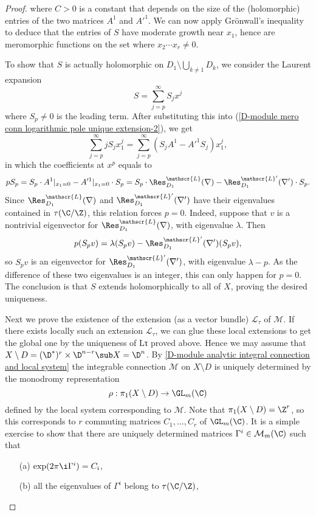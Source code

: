 \begin{proof}
where $C>0$ is a constant that depends on the size of the (holomorphic) entries of the two matrices $A^1$ and $A'^1$. We can now apply Gr\"onwall's inequality to deduce that the entries of $S$ have moderate growth near $x_1$, hence are meromorphic functions on the set where $x_2\cdots x_r\neq 0$.\par
To show that $S$ is actually holomorphic on $D_1\setminus\bigcup_{k\neq 1}D_k$, we consider the Laurent expansion
\[S=\sum_{j=p}^{\infty}S_jx^j\]
where $S_p\neq 0$ is the leading term. After substituting this into (\ref{D-module mero conn logarithmic pole unique extension-2}), we get
\[\sum_{j=p}^{\infty}jS_jx_1^j=\sum_{j=p}^{\infty}(S_jA^1-A'^1S_j)x_1^j,\]
in which the coefficients at $x^p$ equals to
\[pS_p=S_p\cdot A^1|_{x_1=0}-A'^1|_{x_1=0}\cdot S_p=S_p\cdot\Res_{D_1}^{\mathscr{L}}(\nabla)-\Res_{D_1}^{\mathscr{L}'}(\nabla')\cdot S_p.\]
Since $\Res_{D_1}^{\mathscr{L}}(\nabla)$ and $\Res_{D_1}^{\mathscr{L}'}(\nabla')$ have their eigenvalues contained in $\tau(\C/\Z)$, this relation forces $p=0$. Indeed, suppose that $v$ is a nontrivial eigenvector
for $\Res_{D_1}^{\mathscr{L}}(\nabla)$, with eigenvalue $\lambda$. Then
\[p(S_pv)=\lambda(S_pv)-\Res_{D_1}^{\mathscr{L}'}(\nabla')(S_pv),\]
so $S_pv$ is an eigenvector for $\Res_{D_1}^{\mathscr{L}'}(\nabla')$, with eigenvalue $\lambda-p$. As the difference of these two eigenvalues is an integer, this can only happen for $p=0$. The conclusion is that $S$ extends holomorphically to all of $X$, proving the desired uniqueness.\par
Next we prove the existence of the extension (as a vector bundle) $\mathscr{L}_\tau$ of $\mathscr{M}$. If there exists locally such an extension $\mathscr{L}_\tau$, we can glue these local extensions to get the global one by the uniqueness of Lτ proved above. Hence we may assume that $X\setminus D=(\D^*)^r\times\D^{n-r}\sub X=\D^n$. By \cref{D-module analytic integral connection and local system} the integrable connection $\mathscr{M}$ on $X\setminus D$ is uniquely determined by the monodromy representation
\[\rho:\pi_1(X\setminus D)\to\GL_m(\C)\]
defined by the local system corresponding to $\mathscr{M}$. Note that $\pi_1(X\setminus D)=\Z^r$, so this corresponds to $r$ commuting matrices $C_1,\dots,C_r$ of $\GL_m(\C)$. It is a simple exercise to show that there are uniquely determined matrices $\Gamma^i\in\mathcal{M}_m(\C)$ such that
\begin{enumerate}
    \item[(a)] $\exp(2\pi\i\Gamma^i)=C_i$,
    \item[(b)] all the eigenvalues of $\Gamma^i$ belong to $\tau(\C/\Z)$,

\end{enumerate}
\end{proof}
